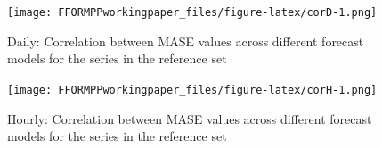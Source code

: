 \documentclass[11pt,a4paper,]{article}
\begin{document}
\begin{figure}
\centering
\texttt{[image: FFORMPPworkingpaper\_files/figure-latex/corD-1.png]}
\caption{\label{fig:corD}Daily: Correlation between MASE values across different forecast models for the series in the reference set}
\end{figure}

\begin{figure}
\centering
\texttt{[image: FFORMPPworkingpaper\_files/figure-latex/corH-1.png]}
\caption{\label{fig:corH}Hourly: Correlation between MASE values across different forecast models for the series in the reference set}
\end{figure}

\printbibliography
\end{document}
